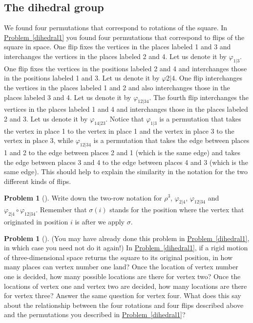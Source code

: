 \documentclass[10pt,]{book}
\theoremstyle{plain}
\theoremstyle{definition}
\newtheorem{activity}[project]{Problem}
\theoremstyle{definition}
\numberwithin{equation}{chapter}
\begin{document}
\subsection[{The dihedral group}]{The dihedral group}\label{subsection-61}
We found four permutations that correspond to rotations of the square. In \hyperref[dihedral1]{Problem~\ref{dihedral1}} you found four permutations that correspond to flips of the square in space. One flip fixes the vertices in the places labeled 1 and 3 and interchanges the vertices in the places labeled 2 and 4. Let us denote it by \(\varphi_{1|3}\). One flip fixes the vertices in the positions labeled 2 and 4 and interchanges those in the positions labeled 1 and 3. Let us denote it by \(\varphi{2|4}\). One flip interchanges the vertices in the places labeled 1 and 2 and also interchanges those in the places labeled 3 and 4. Let us denote it by \(\varphi_{12|34}\). The fourth flip interchanges the vertices in the places labeled 1 and 4 and interchanges those in the places labeled 2 and 3. Let us denote it by \(\varphi_{14|23}\). Notice that \(\varphi_{1|3}\) is a permutation that takes the vertex in place 1 to the vertex in place 1 and the vertex in place 3 to the vertex in place 3, while \(\varphi_{12|34}\) is a permutation that takes the edge between places 1 and 2 to the edge between places 2 and 1 (which is the same edge) and takes the edge between places 3 and 4 to the edge between places 4 and 3 (which is the same edge). This should help to explain the similarity in the notation for the two different kinds of flips.%
\begin{activity}[] \label{dihedral2}
Write down the two-row notation for \(\rho^3\), \(\varphi_{2|4}\), \(\varphi_{12|34}\) and \(\varphi_{2|4}\circ \varphi_{12|34}\). Remember that \(\sigma(i)\) stands for the position where the vertex that originated in position \(i\) is after we apply \(\sigma\).%
\end{activity}
\begin{activity}[]\marginsymbol[-1em]{} \label{activity-260}
(You may have already done this problem in \hyperref[dihedral1]{Problem~\ref{dihedral1}}, in which case you need not do it again!) In \hyperref[dihedral1]{Problem~\ref{dihedral1}}, if a rigid motion of three-dimensional space returns the square to its original position, in how many places can vertex number one land? Once the location of vertex number one is decided, how many possible locations are there for vertex two? Once the locations of vertex one and vertex two are decided, how many locations are there for vertex three? Answer the same question for vertex four. What does this say about the relationship between the four rotations and four flips described above and the permutations you described in \hyperref[dihedral1]{Problem~\ref{dihedral1}}?%
\end{activity}
\end{document}
